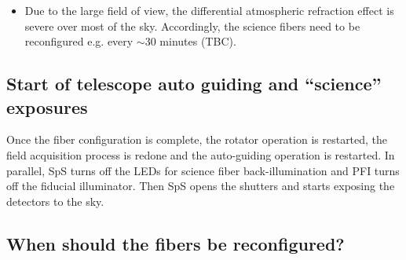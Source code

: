 \documentclass[a4paper]{article}
\begin{document}
\begin{itemize}
  criteria are different among the three main science areas in the
  plan of PFS SSP survey\cite{takada14}, all are planning to acquire
  data with no beam-switching to blank sky. (The instrument control
  system will however accommodate the beam switching capability as an
  option.)  This will maximize the on-source integration time over the
  observing time and minimize the geometric constraints in the
  allocation of science fibers to science targets\footnote{In
    cross-beam switching observations, two fibers are assigned to one
    science target and the telescope pointing is dithered between one
    exposure and another so that in the first exposure one of the
    fibers is placed on the target and the other observes blank sky,
    and in the next exposure, they switch the role. This way, 100\% of
    the exposure time can be used for on-source integration, but the
    fibers can be significantly less flexibly allocated to targets.}.
 \item Due to the large field of view, the differential atmospheric
   refraction effect is severe over most of the sky. Accordingly, the
   science fibers need to be reconfigured e.g. every $\sim$30 minutes
   (TBC).
\end{itemize}

\subsection{Start of telescope auto guiding and ``science'' exposures}

Once the fiber configuration is complete, the rotator operation is
restarted, the field acquisition process is redone and the
auto-guiding operation is restarted. In parallel, SpS turns off the
LEDs for science fiber back-illumination and PFI turns off the
fiducial illuminator. Then SpS opens the shutters and starts exposing
the detectors to the sky.

\subsection{When should the fibers be reconfigured?}
\end{document}
